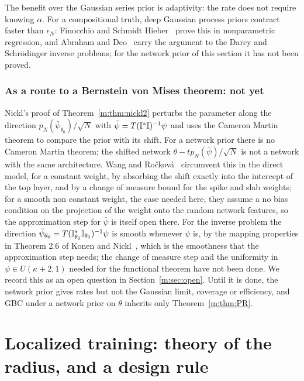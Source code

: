 The benefit over the Gaussian series prior is adaptivity: the rate does not require knowing $\alpha$. For a compositional truth, deep Gaussian process priors contract faster than $\epsilon_N$: Finocchio and Schmidt Hieber~\cite{finocchioschmidthieber2023} prove this in nonparametric regression, and Abraham and Deo~\cite{abrahamdeo2023} carry the argument to the Darcy and Schr\"odinger inverse problems; for the network prior of this section it has not been proved.

\subsubsection{As a route to a Bernstein von Mises theorem: not yet} Nickl's proof of Theorem~\ref{m:thm:nickl2} perturbs the parameter along the direction $p_N(\bar\psi_{\theta_0})/\sqrt N$ with $\bar\psi=T(\mathbb{I}^*\mathbb{I})^{-1}\psi$ and uses the Cameron Martin theorem to compare the prior with its shift. For a network prior there is no Cameron Martin theorem; the shifted network $\theta-tp_N(\bar\psi)/\sqrt N$ is not a network with the same architecture. Wang and Ro\v{c}kov\'a~\cite{wangrockova2020} circumvent this in the direct model, for a constant weight, by absorbing the shift exactly into the intercept of the top layer, and by a change of measure bound for the spike and slab weights; for a smooth non constant weight, the case needed here, they assume a no bias condition on the projection of the weight onto the random network features, so the approximation step for $\bar\psi$ is itself open there. For the inverse problem the direction $\bar\psi_{\theta_0}=T(\mathbb{I}^*_{\theta_0}\mathbb{I}_{\theta_0})^{-1}\psi$ is smooth whenever $\psi$ is, by the mapping properties in Theorem 2.6 of Konen and Nickl~\cite{konennickl2026}, which is the smoothness that the approximation step needs; the change of measure step and the uniformity in $\psi\in U(\kappa+2,1)$ needed for the functional theorem have not been done. We record this as an open question in Section~\ref{m:sec:open}. Until it is done, the network prior gives rates but not the Gaussian limit, coverage or efficiency, and GBC under a network prior on $\theta$ inherits only Theorem~\ref{m:thm:PR}.

\section{Localized training: theory of the radius, and a design rule}\label{m:sec:loc}


